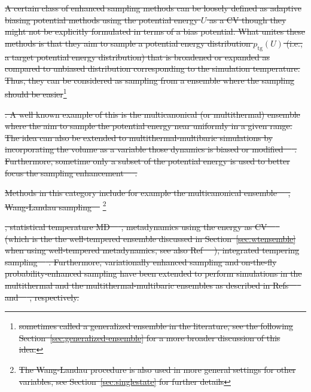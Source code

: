\documentclass[9pt,review]{livecoms}
\providecommand{\DIFdeltex}[1]{{\protect\color{red}\sout{#1}}}                      %
\providecommand{\DIFdel}[1]{\texorpdfstring{\DIFdeltex{#1}}{}} %
\begin{document}
\DIFdel{A certain class of enhanced sampling methods can be loosely defined as adaptive biasing potential methods using the potential energy $U$ as a CV though they might not be explicitly formulated in terms of a bias potential. What unites these methods is that they aim to sample a potential energy distribution $p_{\mathrm{tg}}(U)$ (i.e., a target potential energy distribution) that is broadened or expanded as compared to unbiased distribution corresponding to the simulation temperature. Thus, they can be considered as sampling from a ensemble where the sampling should be easier}\footnote{\DIFdel{sometimes called a generalized ensemble in the literature, see the following Section~\ref{sec:generalized-ensemble} for a more broader discussion of this idea.}}%
\addtocounter{footnote}{-1}%
\DIFdel{. A well known example of this is the multicanonical (or multithermal) ensemble where the aim to sample the potential energy near uniformly in a given range. The idea can also be extended to multithermal-multibaric simulations by incorporating the volume as a variable those dynamics is biased or modified~\mbox{%
\cite{Okumura_MultiTP_2004,Shell_MultiTP_2002}}\hspace{0pt}%
. Furthermore, sometime only a subset of the potential energy is used to better focus the sampling enhancement~\mbox{%
\cite{Yang_SITS_2009}}\hspace{0pt}%
.
}%

\DIFdel{Methods in this category include for example
the multicanonical ensemble~\mbox{%
\cite{Berg1992_Multicanonical}}\hspace{0pt}%
,
Wang-Landau sampling~\mbox{%
\cite{wang-landau:prl:2001:wang-landau}}\hspace{0pt}%
}\footnote{\DIFdel{The Wang-Landau procedure is also used in more general settings for other variables, see Section~\ref{sec:singlestate} for further details}}%
\addtocounter{footnote}{-1}%
\DIFdel{,
statistical temperature MD~\mbox{%
\cite{Kim2006_PRL_STMD}}\hspace{0pt}%
,
metadynamics using the energy as CV~\mbox{%
\cite{Micheletti_MetaE_Energy_2004,Bonomi-PRL-2010}
}\hspace{0pt}%
(which is the the well-tempered ensemble discussed in Section~\ref{sec:wtensemble} when using well-tempered metadynamics, see also Ref~\mbox{%
\cite{Valsson-JCTC-2013}}\hspace{0pt}%
),
integrated tempering sampling~\mbox{%
\cite{Gao_ITS_2008,Gao_ITS_Review_2015}}\hspace{0pt}%
.
Furthermore, variationally enhanced sampling and on-the-fly probability-enhanced sampling have been extended to perform simulations in the multithermal and the multithermal-multibaric ensembles as described in Refs~\mbox{%
\citep{Piaggi_MultiVES_2019,Piaggi_MultiVES+CV_2019} }\hspace{0pt}%
and~\mbox{%
\citep{invernizzi2020unified}}\hspace{0pt}%
, respectively.
}%
\end{document}
